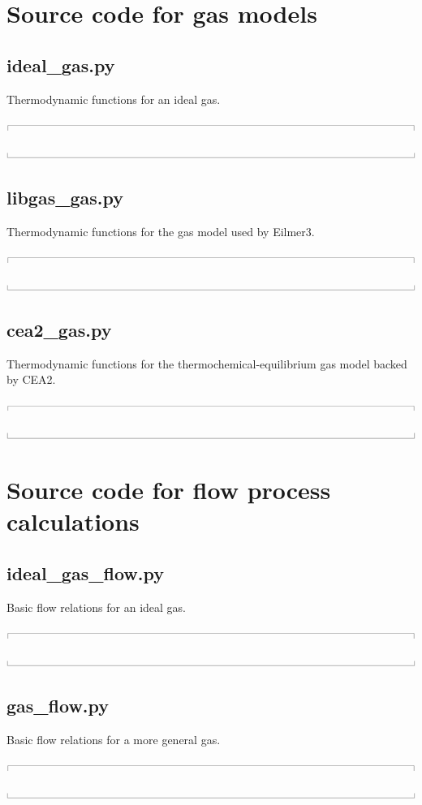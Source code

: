 \documentclass[10pt,a4paper]{article}
\newcommand{\topbar}{\ensuremath{
    \rule{0.1mm}{2.0mm} \rule[2.0mm]{159.5mm}{0.1mm} \rule{0.1mm}{2.0mm}
}}
\newcommand{\bottombar}{\ensuremath{
    \rule{0.1mm}{2.0mm} \rule{159.5mm}{0.1mm} \rule{0.1mm}{2.0mm}
}}
\begin{document}
\newpage
\appendix
\section{Source code for gas models}
%
\subsection{ideal\_gas.py}
\label{ideal-gas-py}
%
Thermodynamic functions for an ideal gas.

\noindent\topbar

\bottombar

\newpage
\subsection{libgas\_gas.py}
\label{libgas-gas-py}
%
Thermodynamic functions for the gas model used by Eilmer3.

\noindent\topbar

\bottombar

\newpage
\subsection{cea2\_gas.py}
\label{cea2-gas-py}
%
Thermodynamic functions for the thermochemical-equilibrium gas model backed by CEA2.

\noindent\topbar

\bottombar

\newpage
\section{Source code for flow process calculations}
%
\subsection{ideal\_gas\_flow.py}
\label{ideal-gas-flow-py}
%
Basic flow relations for an ideal gas.

\noindent\topbar

\bottombar

\newpage
\subsection{gas\_flow.py}
\label{gas-flow-py}
%
Basic flow relations for a more general gas.

\noindent\topbar

\bottombar
\end{document}
